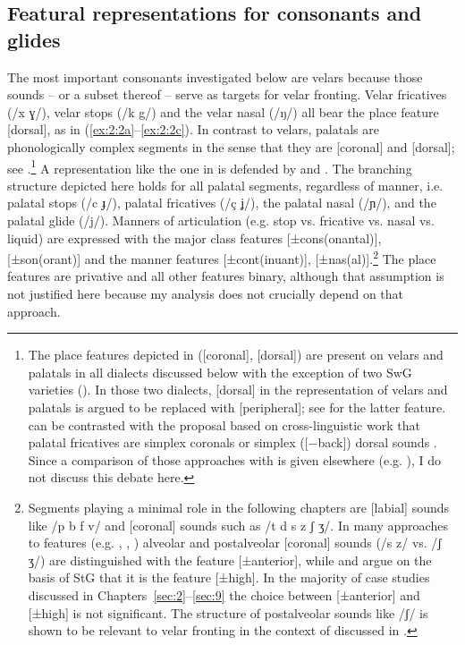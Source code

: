 \subsection{Featural representations for consonants and glides}\label{sec:2.2.2}
\begin{sloppypar}
The most important consonants investigated below are velars because those sounds -- or a subset thereof -- serve as targets for velar fronting. Velar fricatives (/x ɣ/), velar stops (/k g/) and the velar nasal (/ŋ/) all bear the place feature [dorsal], as in (\ref{ex:2:2a}--\ref{ex:2:2c}). In contrast to velars, palatals are phonologically complex segments in the sense that they are [coronal] and [dorsal]; see .\footnote{\label{fn:2:1}The place features depicted in  ([coronal], [dorsal]) are present on velars and palatals in all dialects discussed below with the exception of two SwG varieties (). In those two dialects, [dorsal] in the representation of velars and palatals is argued to be replaced with [peripheral]; see \citet{Rice1994} for the latter feature.  can be contrasted with the proposal based on cross-linguistic work that palatal fricatives are simplex coronals \citep{Hume1994} or simplex ([−back]) dorsal sounds \citep{Hall1997}. Since a comparison of those approaches with  is given elsewhere (e.g. \citealt{Hall2014b}), I do not discuss this debate here.} A representation like the one in  is defended by \citet{Robinson2001} and \citet{Hall2014b}. The branching structure depicted here holds for all palatal segments, regardless of manner, i.e. palatal stops (/c ɟ/), palatal fricatives (/ç ʝ/), the palatal nasal (/ɲ/), and the palatal glide (/j/). Manners of articulation (e.g. stop vs. fricative vs. nasal vs. liquid) are expressed with the major class features [±cons(onantal)], [±son(orant)] and the manner features [±cont(inuant)], [±nas(al)].\footnote{Segments playing a minimal role in the following chapters are [labial] sounds like /p b f v/ and [coronal] sounds such as /t d s z ʃ ʒ/. In many approaches to features (e.g. \citealt{Sagey1986}, \citealt{ClementsHume1995}, \citealt{Hall1997}) alveolar and postalveolar [coronal] sounds (/s z/ vs. /ʃ ʒ/) are distinguished with the feature [±anterior], while \citet{Hall1992} and \citet{Wiese1996a} argue on the basis of StG that it is the feature [±high]. In the majority of case studies discussed in Chapters~\ref{sec:2}--\ref{sec:9} the choice between [±anterior] and [±high] is not significant. The structure of postalveolar sounds like /ʃ/ is shown to be relevant to velar fronting in the context of  discussed in .} The place features are privative and all other features binary, although that assumption is not justified here because my analysis does not crucially depend on that approach.
\end{sloppypar}

